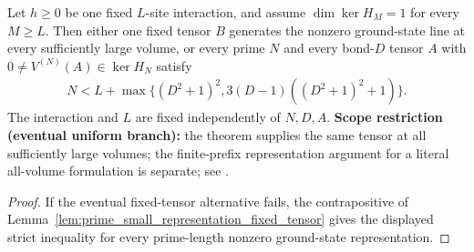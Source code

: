 \begin{theorem}
    \label{thm:eventual_mps_prime_length_dichotomy}
    \leanok
    Let $h\ge0$ be one fixed $L$-site interaction, and assume
    $\dim\ker H_M=1$ for every $M\ge L$. Then either one fixed tensor $B$
    generates the nonzero ground-state line at every sufficiently large
    volume, or every prime $N$ and every bond-$D$ tensor $A$ with
    $0\ne V^{(N)}(A)\in\ker H_N$ satisfy
    \begin{align}
        N<L+\max\{(D^2+1)^2,3(D-1)((D^2+1)^2+1)\}.
        \label{eq:eventual_mps_prime_length_dichotomy}
    \end{align}
    The interaction and $L$ are fixed independently of $N,D,A$.
    \textbf{Scope restriction (eventual uniform branch):}
    the theorem supplies the same tensor at all sufficiently large volumes;
    the finite-prefix representation argument for a literal all-volume
    formulation is separate; see
    \cite{gap:spwc10_ground_state_dichotomy_quantifiers}.
\end{theorem}
\begin{proof}\leanok
    If the eventual fixed-tensor alternative fails, the contrapositive of
    Lemma~\ref{lem:prime_small_representation_fixed_tensor} gives the displayed
    strict inequality for every prime-length nonzero ground-state representation.
\end{proof}


